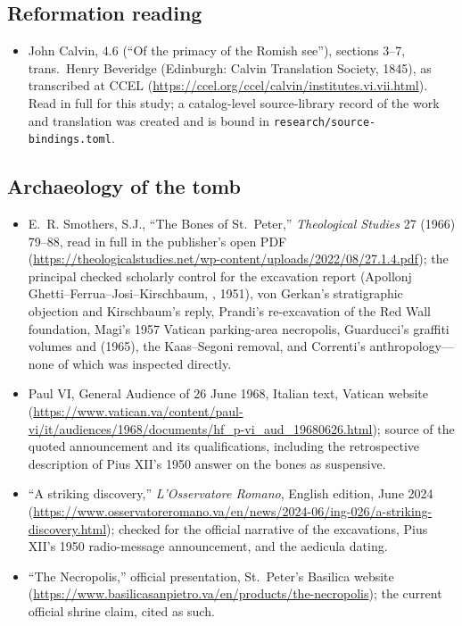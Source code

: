 \subsection*{Reformation reading}

\begin{itemize}
\item John Calvin,  4.6
(``Of the primacy of the Romish see''), sections 3--7, trans.\ Henry
Beveridge (Edinburgh: Calvin Translation Society, 1845), as transcribed at
CCEL (\url{https://ccel.org/ccel/calvin/institutes.vi.vii.html}). Read in
full for this study; a catalog-level source-library record of the work and
translation was created and is bound in
\texttt{research/source-bindings.toml}.
\end{itemize}

\subsection*{Archaeology of the tomb}

\begin{itemize}
\item E.~R. Smothers, S.J., ``The Bones of St.~Peter,'' \textit{Theological
Studies} 27 (1966) 79--88, read in full in the publisher's open PDF
(\url{https://theologicalstudies.net/wp-content/uploads/2022/08/27.1.4.pdf});
the principal checked scholarly control for the excavation report
(Apollonj Ghetti--Ferrua--Josi--Kirschbaum, , 1951),
von Gerkan's stratigraphic objection and Kirschbaum's reply, Prandi's
re-excavation of the Red Wall foundation, Magi's 1957 Vatican
parking-area necropolis, Guarducci's graffiti volumes and  (1965), the Kaas--Segoni removal, and Correnti's
anthropology---none of which was inspected directly.
\item Paul VI, General Audience of 26 June 1968, Italian text, Vatican
website
(\url{https://www.vatican.va/content/paul-vi/it/audiences/1968/documents/hf_p-vi_aud_19680626.html});
source of the quoted announcement and its qualifications, including the
retrospective description of Pius XII's 1950 answer on the bones as
suspensive.
\item ``A striking discovery,'' \textit{L'Osservatore Romano}, English
edition, June 2024
(\url{https://www.osservatoreromano.va/en/news/2024-06/ing-026/a-striking-discovery.html});
checked for the official narrative of the excavations, Pius XII's 1950
radio-message announcement, and the aedicula dating.
\item ``The Necropolis,'' official presentation, St.~Peter's Basilica
website (\url{https://www.basilicasanpietro.va/en/products/the-necropolis});
the current official shrine claim, cited as such.
\end{itemize}

